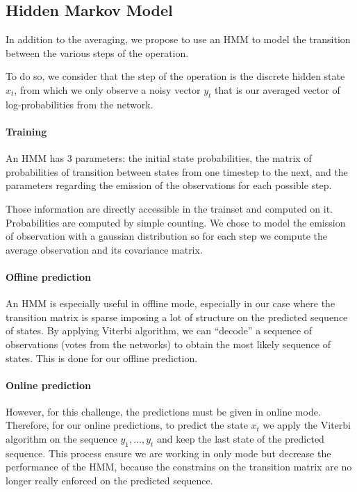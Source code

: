 \documentclass[10pt,twocolumn,letterpaper]{article}
\begin{document}
\subsection{Hidden Markov Model}

In addition to the averaging, we propose to use an HMM to model the transition
between the various steps of the operation.

To do so, we consider that the step of the operation is the discrete hidden state $x_t$,
from which we only observe a noisy vector $y_t$ that is our averaged vector of log-probabilities from
the network.

\paragraph{Training} An HMM has 3 parameters: the initial state probabilities, the matrix of probabilities
of transition between states from one timestep to the next, and the parameters
regarding the emission of the observations for each possible step.

Those information are directly accessible in the trainset and computed on it.
Probabilities are computed by simple counting. We chose to model the emission of
observation with a gaussian distribution so for each step we compute the average
observation and its covariance matrix.

\paragraph{Offline prediction} An HMM is especially useful in offline mode, especially
in our case where the transition matrix is sparse imposing a lot of structure on
the predicted sequence of states. By applying Viterbi algorithm, we can ``decode''
a sequence of observations (votes from the networks) to obtain the most likely
sequence of states. This is done for our offline prediction.

\paragraph{Online prediction} However, for this challenge, the predictions must
be given in online mode. Therefore, for our online predictions, to predict the state
$x_t$ we apply the Viterbi algorithm on the sequence $y_1,...,y_t$ and keep the
last state of the predicted sequence. This process ensure we are working in only
mode but decrease the performance of the HMM, because the constrains on the transition
matrix are no longer really enforced on the predicted sequence.
\end{document}
